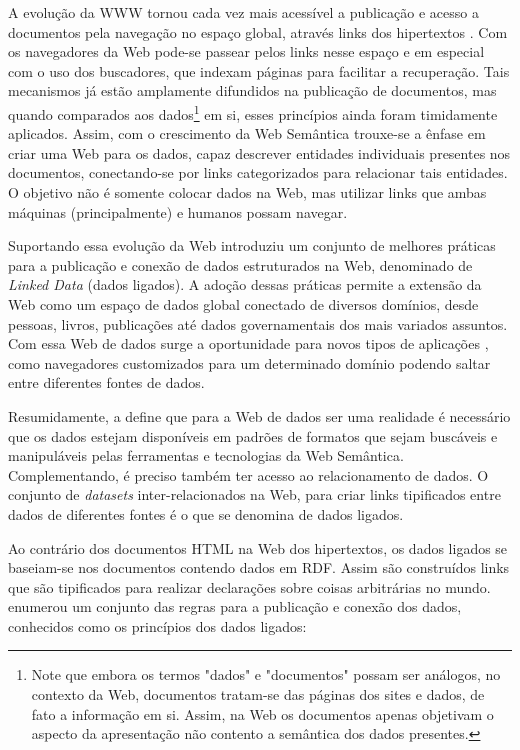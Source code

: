 A evolução da WWW tornou cada vez mais acessível a publicação e acesso a documentos pela navegação no espaço global, através links dos hipertextos \citep{Bizer2009}. Com os navegadores da Web pode-se passear pelos links nesse espaço e em especial com o uso dos buscadores, que indexam páginas para facilitar a recuperação. Tais mecanismos já estão amplamente difundidos na publicação de documentos, mas quando comparados aos dados\footnote{Note que embora os termos "dados" e "documentos" possam ser análogos, no contexto da Web, documentos tratam-se das páginas dos sites e dados, de fato a informação em si. Assim, na Web os documentos apenas objetivam o aspecto da apresentação não contento a semântica dos dados presentes.} em si, esses princípios ainda foram timidamente aplicados. Assim, com o crescimento da Web Semântica trouxe-se a ênfase em criar uma Web para os dados, capaz descrever entidades individuais presentes nos documentos, conectando-se por links categorizados para relacionar tais entidades. O objetivo não é somente colocar dados na Web, mas utilizar links que ambas máquinas (principalmente) e humanos possam navegar.

Suportando essa evolução da Web \citep{LinkedData:2006} introduziu um conjunto de melhores práticas para a publicação e conexão de dados estruturados na Web, denominado de \textit{Linked Data} (dados ligados). A adoção dessas práticas permite a extensão da Web como um espaço de dados global conectado de diversos domínios, desde pessoas, livros, publicações até dados governamentais dos mais variados assuntos. Com essa Web de dados surge a oportunidade para novos tipos de aplicações \citep{Bizer2009}, como navegadores customizados para um determinado domínio podendo saltar entre diferentes fontes de dados.

Resumidamente, a \cite{LinkedDataW3C} define que para a Web de dados ser uma realidade é necessário que os dados estejam disponíveis em padrões de formatos que sejam buscáveis e manipuláveis pelas ferramentas e tecnologias da Web Semântica. Complementando, é preciso também ter acesso ao relacionamento de dados. O conjunto de \textit{datasets} inter-relacionados na Web, para criar links tipificados entre dados de diferentes fontes é o que se denomina de dados ligados.

Ao contrário dos documentos \ac{HTML} na Web dos hipertextos, os dados ligados se baseiam-se nos documentos contendo dados em RDF. Assim são construídos links que são tipificados para realizar declarações sobre coisas arbitrárias no mundo. \cite{LinkedData:2006} enumerou um conjunto das regras para a publicação e conexão dos dados, conhecidos como os princípios dos dados ligados:

